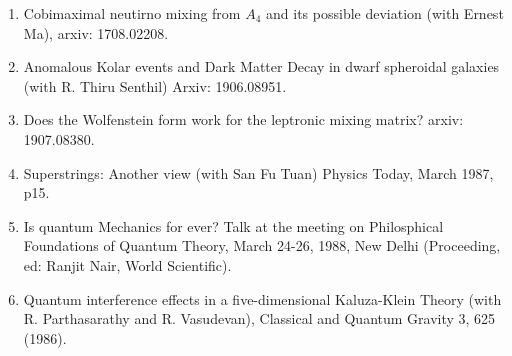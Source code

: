 \begin{enumerate}
\item Cobimaximal neutirno mixing from $A_4$ and its possible deviation (with Ernest Ma), arxiv: 1708.02208.

\item Anomalous Kolar events and Dark Matter Decay in dwarf spheroidal galaxies (with R. Thiru Senthil) Arxiv: 1906.08951.

\item Does the Wolfenstein form work for the leptronic mixing matrix? arxiv: 1907.08380.

\item Superstrings: Another view (with San Fu Tuan) Physics Today, March 1987, p15.

\item Is quantum Mechanics for ever? Talk at the meeting on Philosphical Foundations of Quantum Theory, March 24-26, 1988, New Delhi (Proceeding, ed: Ranjit Nair, World Scientific).

\item Quantum interference effects in a five-dimensional Kaluza-Klein Theory (with R. Parthasarathy and R. Vasudevan), Classical and Quantum Gravity 3, 625 (1986).

\end{enumerate}  


%



